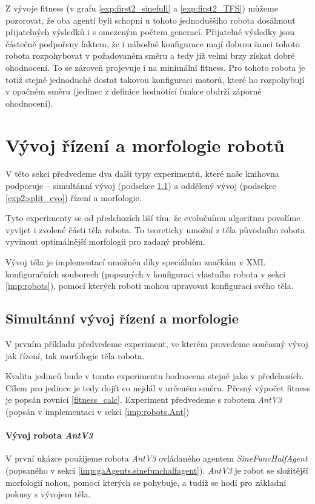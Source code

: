 \pagebreak
Z vývoje fitness (v grafu \ref{exp:first2_sinefull} a \ref{exp:first2_TFS})
můžeme pozorovat, že oba agenti byli schopní u tohoto jednoduššího robota
dosáhnout přijatelných výsledků i s omezeným počtem generací. Přijatelné
výsledky jsou částečně podpořeny faktem, že i náhodně konfigurace mají dobrou
šanci tohoto robota rozpohybovat v požadovaném směru a tedy již velmi brzy
získat dobré ohodnocení. To se zároveň projevuje i na minimální fitness. Pro
tohoto robota je totiž stejně jednoduché dostat takovou konfiguraci motorů,
které ho rozpohybují v opačném směru (jedinec z definice hodnotící funkce
obdrží záporné ohodnocení).

\section{Vývoj řízení a morfologie robotů} \label{exp2}

V této sekci předvedeme dva další typy experimentů, které naše knihovna
podporuje -- simultánní vývoj (podsekce \ref{exp2:para_evo}) a oddělený
vývoj (podsekce \ref{exp2:split_evo}) řízení a morfologie.

Tyto experimenty se od předchozích liší tím, že evolučnímu algoritmu povolíme
vyvíjet i zvolené části těla robota. To teoreticky umožní z těla původního
robota vyvinout optimálnější morfologii pro zadaný problém.

Vývoj těla je implementací umožněn díky speciálním značkám v XML konfiguračních
souborech (popsaných v konfiguraci vlastního robota v sekci \ref{imp:robots}),
pomocí kterých roboti mohou upravovat konfiguraci svého těla.

\subsection{Simultánní vývoj řízení a morfologie} \label{exp2:para_evo}

V prvním příkladu předvedeme experiment, ve kterém provedeme současný vývoj jak
řízení, tak morfologie těla robota.

Kvalita jedinců bude v tomto experimentu hodnocena stejně jako v předchozích.
Cílem pro jedince je tedy dojít co nejdál v určeném směru. Přesný výpočet
fitness je popsán rovnicí \ref{fitness_calc}. Experiment předvedeme s robotem
\emph{AntV3} (popsán v implementaci v sekci \ref{imp:robots.Ant})

\paragraph{Vývoj robota \emph{AntV3}}
V první ukázce použijeme robota \emph{AntV3} ovládaného agentem
\emph{SineFuncHalfAgent} (popsaného v sekci
\ref{imp:gaAgents.sinefunchalfagent}). \emph{AntV3} je robot se složitější
morfologií nohou, pomocí kterých se pohybuje, a tudíž se hodí pro základní
pokusy s vývojem těla. 

